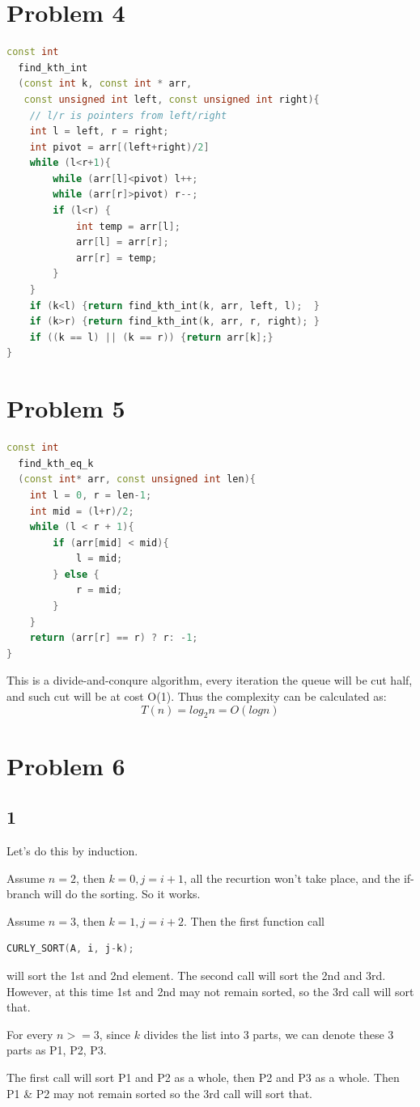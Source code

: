 \documentclass{article}
\begin{document}
\section*{Problem 4}
\begin{lstlisting}[language = C++]
const int 
  find_kth_int
  (const int k, const int * arr, 
   const unsigned int left, const unsigned int right){
    // l/r is pointers from left/right
    int l = left, r = right;
    int pivot = arr[(left+right)/2]
    while (l<r+1){
        while (arr[l]<pivot) l++;
        while (arr[r]>pivot) r--;
        if (l<r) {
            int temp = arr[l];
            arr[l] = arr[r];
            arr[r] = temp;
        }   
    }
    if (k<l) {return find_kth_int(k, arr, left, l);  }
    if (k>r) {return find_kth_int(k, arr, r, right); }
    if ((k == l) || (k == r)) {return arr[k];}
}
\end{lstlisting}
\section*{Problem 5}
\begin{lstlisting}[language = C++]
const int 
  find_kth_eq_k
  (const int* arr, const unsigned int len){
    int l = 0, r = len-1;
    int mid = (l+r)/2;
    while (l < r + 1){
        if (arr[mid] < mid){
            l = mid;
        } else {
            r = mid;
        }
    }
    return (arr[r] == r) ? r: -1;
}
\end{lstlisting}
This is a divide-and-conqure algorithm, every iteration the queue will be cut half, and such cut will be at cost O(1). Thus the complexity can be calculated as:
$$T(n) = log_2 n = O(logn)$$
\section*{Problem 6}
  \subsection*{1}
    \par Let's do this by induction.
    \par Assume $n = 2$, then $k = 0, j = i + 1$, all the recurtion won't take place, and the if-branch will do the sorting. So it works.
    \par Assume $n = 3$, then $k = 1, j = i + 2$. Then the first function call 
    \begin{lstlisting}[language = C++]
        CURLY_SORT(A, i, j-k);\end{lstlisting} will sort the 1st and 2nd element. The second call will sort the 2nd and 3rd. However, at this time 1st and 2nd may not remain sorted, so the 3rd call will sort that.
    \par For every $n>=3$, since $k$ divides the list into 3 parts, we can denote these 3 parts as P1, P2, P3.
    \par The first call will sort P1 and P2 as a whole, then P2 and P3 as a whole. Then P1 \& P2 may not remain sorted so the 3rd call will sort that.
\end{document}
